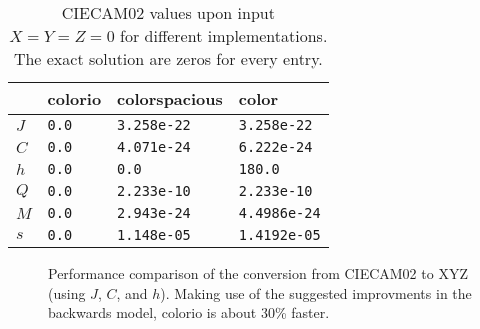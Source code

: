 \documentclass[twocolumn]{scrartcl}
\theoremstyle{named}
\begin{document}
\begin{table}\centering
  \begin{tabularx}{\linewidth}{llXX}
  \toprule
          & colorio & colorspacious   & color\\
  \midrule
    $J$ & \texttt{0.0} & \texttt{3.258e-22} & \texttt{3.258e-22}\\
    $C$ & \texttt{0.0} & \texttt{4.071e-24} & \texttt{6.222e-24}\\
    $h$ & \texttt{0.0} & \texttt{0.0}       & \texttt{180.0}\\
    $Q$ & \texttt{0.0} & \texttt{2.233e-10} & \texttt{2.233e-10}\\
    $M$ & \texttt{0.0} & \texttt{2.943e-24} & \texttt{4.4986e-24}\\
    $s$ & \texttt{0.0} & \texttt{1.148e-05} & \texttt{1.4192e-05}\\
  \bottomrule
\end{tabularx}
\caption{CIECAM02 values upon input $X=Y=Z=0$ for different implementations.
  The exact solution are zeros for every entry.}
\end{table}

\begin{figure}

  \caption{Performance comparison of the conversion from CIECAM02 to XYZ (using
  $J$, $C$, and $h$). Making use of the suggested improvments in the backwards model,
  colorio is about 30\% faster.}
\end{figure}

%
%
%
%
%
%
%

\printbibliography{}
\end{document}
